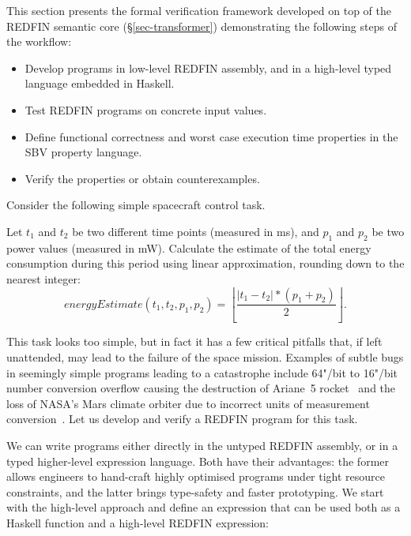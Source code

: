 This section presents the formal verification framework developed on top of
the REDFIN semantic core (\S\ref{sec-transformer}) demonstrating the following
steps of the workflow:

\begin{itemize}
    \item Develop programs in low-level REDFIN assembly, and in a high-level
    typed language embedded in Haskell.
    \item Test REDFIN programs on concrete input values.
    \item Define functional correctness and worst case execution time properties
    in the SBV property language.
    \item Verify the properties or obtain counterexamples.
\end{itemize}

\noindent
Consider the following simple spacecraft control task.

\begin{tcolorbox}
Let $t_1$ and $t_2$ be two different time points (measured in ms),
and $p_1$ and $p_2$ be two power values (measured in mW).
Calculate the estimate of the total energy consumption during this period
using linear approximation, rounding down to the nearest integer:
\vspace{1mm}
\[
\textit{energyEstimate}(t_1, t_2, p_1, p_2) = \left\lfloor \frac{|t_1 - t_2| * (p_1 + p_2)}{2} \right\rfloor.
\]
\end{tcolorbox}

\noindent
This task looks too simple, but in fact it has a few critical pitfalls that,
if left unattended, may lead to the failure of the space mission. Examples
of subtle bugs in seemingly simple programs leading to a catastrophe include 64"/bit
to 16"/bit number conversion overflow causing the destruction of Ariane~5
rocket~\cite{bug-rocket} and the loss of NASA's Mars climate orbiter due to incorrect
units of measurement conversion~\cite{NASA:1999:Mars}. Let us develop and verify
a REDFIN program for this task.


We can write programs either directly in the untyped REDFIN assembly, or in a
typed higher-level expression language. Both have their advantages: the former
allows engineers to hand-craft highly optimised programs under tight resource
constraints, and the latter brings type-safety and faster prototyping. We start
with the high-level approach and define an expression that can be used both as a
Haskell function and a high-level REDFIN expression:

